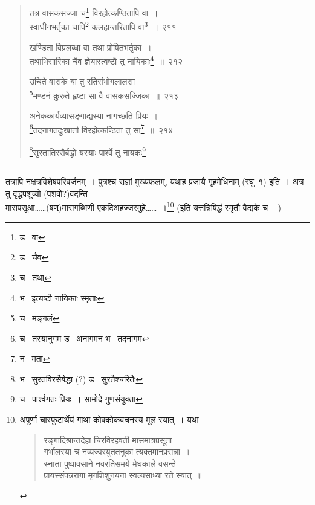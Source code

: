 \documentclass[11pt, openany]{book}
\begin{document}
\newpage

\begin{quote}
{\na तत्र वासकसज्जा च\renewcommand{\thefootnote}{1}\footnote{ड \textendash\  वा} विरहोत्कण्ठितापि वा~।\\
स्वाधीनभर्तृका चापि\renewcommand{\thefootnote}{2}\footnote{ड \textendash\  चैव} कलहान्तरितापि वा\renewcommand{\thefootnote}{3}\footnote{च \textendash\  तथा}~॥~२११

खण्डिता विप्रलब्धा वा तथा प्रोषितभर्तृका~।\\
तथाभिसारिका चैव ज्ञेयास्त्वष्टौ तु नायिकाः\renewcommand{\thefootnote}{4}\footnote{भ \textendash\  इत्यष्टौ नायिकाः स्मृताः}~॥~२१२

उचिते वासके या तु रतिसंभोगलालसा~।\\
\renewcommand{\thefootnote}{5}\footnote{च \textendash\  मङ्गलं}मण्डनं कुरुते हृष्टा सा वै वासकसज्जिका~॥~२१३

अनेककार्यव्यासङ्गाद्यस्या नागच्छति प्रियः~।\\
\renewcommand{\thefootnote}{6}\footnote{च \textendash\  तस्यानुगम ड \textendash\  अनागमन भ \textendash\  तदनागम}तदनागतदुःखार्ता विरहोत्कण्ठिता तु सा\renewcommand{\thefootnote}{7}\footnote{न \textendash\  मता}~॥~२१४

\renewcommand{\thefootnote}{8}\footnote{भ \textendash\  सुरतविरसैर्बद्धा (?) ड \textendash\  सुरतैश्चरितैः}सुरतातिरसैर्बद्धो यस्याः पार्श्वे तु नायकः\renewcommand{\thefootnote}{9}\footnote{च \textendash\  पार्श्वगतः प्रियः~। सामोदे गुणसंयुक्ता}~।}
\end{quote}

\hrule

\vspace{2mm}
\noindent
तत्रापि नक्षत्रविशेषपरिवर्जनम्~। पुत्रश्च राज्ञां मुख्यफलम्, यथाह {\qt प्रजायै गृहमेधिनाम्} (रघु\textendash\ १) इति~। अत्र तु वृद्धपशुव्यो (पशवो?)वदन्ति\textendash \\

मासपसूआ\ldots \ldots (षण्)मासगब्भिणी एकदिअहज्जरमुहे\ldots \ldots ~।\renewcommand{\thefootnote}{*}\footnote{अपूर्णा चास्फुटार्थेयं गाथा कोक्कोकवचनस्य मूलं स्यात्~। यथा\textendash\  

\begin{quote}
{\qt रङ्गादिश्रान्तदेहा चिरविरहवती मासमात्रप्रसूता \\
 गर्भालस्या च नव्यज्वरयुततनुका त्यक्तमानप्रसन्ना~। \\
 स्नाता पुष्पावसाने नवरतिसमये मेघकाले वसन्ते\\
 प्रायस्संपन्नरागा मृगशिशुनयना स्वल्पसाध्या रते स्यात्~॥}
\end{quote}} (इति यत्तन्निषिद्धं स्मृतौ वैद्यके च~।)\\
\end{document}
